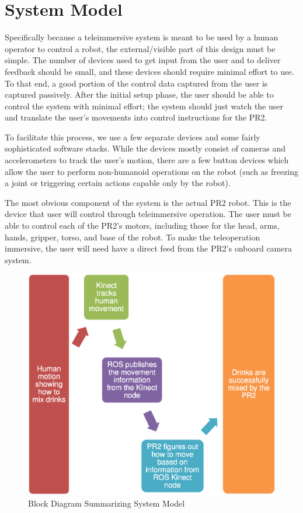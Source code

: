 \documentclass{sig-alternate}
\begin{document}
\section{System Model}
Specifically because a teleimmersive system is meant to be used by a human 
operator to control a robot, the external/visible part of this
design must be simple. The number of devices used to get input from the user 
and to deliver feedback should be small, and these devices should require
minimal effort to use. To that
end, a good portion of the control data captured from the user is captured
passively. After the initial setup phase, the user should be able to control
the system with minimal effort; the system should just watch the user and
translate the user's movements into control instructions for the PR2.

To facilitate this process, we use a few separate devices and some
fairly sophisticated software stacks. While the
devices mostly consist of cameras and accelerometers to track the user's 
motion, there are a few button devices which allow the user to
perform non-humanoid operations on the robot (such as freezing a joint or
triggering certain actions capable only by the robot).

The most obvious component of the system is the actual PR2 robot. This is the
device that user will control through teleimmersive operation. The user must
be able to control each of the PR2's motors, including those for the head,
arms, hands, gripper, torso, and base of the robot. To make the teleoperation
immersive, the user will need have a direct feed from the PR2's onboard
camera system.

\begin{figure}[htb] 
	\begin{center}
		\includegraphics[width=1.0\linewidth]{flowchart}
	\end{center}
	\caption{Block Diagram Summarizing System Model}
	\label{fig:some_graph}
\end{figure}
\end{document}
